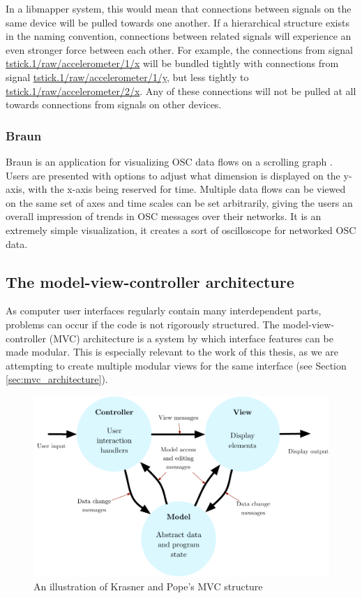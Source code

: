 In a libmapper system, this would mean that connections between signals on the same device will be pulled towards one another. If a hierarchical structure exists in the naming convention, connections between related signals will experience an even stronger force between each other. For example, the connections from signal \url{tstick.1/raw/accelerometer/1/x} will be bundled tightly with connections from signal \url{tstick.1/raw/accelerometer/1/y}, but less tightly to \url{tstick.1/raw/accelerometer/2/x}. Any of these connections will not be pulled at all towards connections from signals on other devices.


	\subsubsection{Braun}

Braun is an application for visualizing OSC data flows on a scrolling graph \cite{braun}. Users are presented with options to adjust what dimension is displayed on the y-axis, with the x-axis being reserved for time. Multiple data flows can be viewed on the same set of axes and time scales can be set arbitrarily, giving the users an overall impression of trends in OSC messages over their networks. It is an extremely simple visualization, it creates a sort of oscilloscope for networked OSC data.

\subsection{The model-view-controller architecture}
\label{sec:mvc_background}

As computer user interfaces regularly contain many interdependent parts, problems can occur if the code is not rigorously structured. The model-view-controller (MVC) architecture \cite{MVC_krasnerpope} is a system by which interface features can be made modular. This is especially relevant to the work of this thesis, as we are attempting to create multiple modular views for the same interface (see Section \ref{sec:mvc_architecture}).

\begin{figure}[h]
\centering
	\includegraphics[width=1\textwidth]{figures/MVC}
\caption{An illustration of Krasner and Pope's MVC structure}
\label{fig:mvc}
\end{figure}

